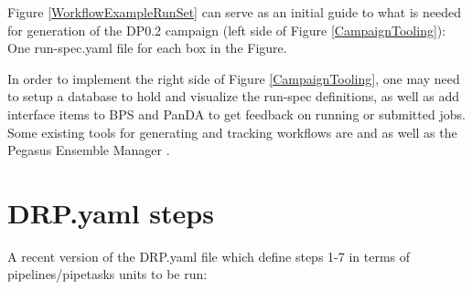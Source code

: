 \documentclass[DM,authoryear,toc]{lsstdoc}
\begin{document}
Figure \ref{WorkflowExampleRunSet} can serve as an initial guide to
what is needed for generation of the DP0.2 campaign (left side of Figure 
\ref{CampaignTooling}): One run-spec.yaml file for each box in the Figure.  

In order to implement the right side of Figure \ref{CampaignTooling}, one may
need to setup a database to hold and visualize the run-spec definitions, 
as well as add interface items to BPS and PanDA to get feedback on running
or submitted jobs.  Some existing tools for generating and tracking 
workflows are \cite{airflow} and \cite{POMS} as well as the Pegasus Ensemble Manager \cite{PEM}.

\section{DRP.yaml steps}
A recent version of the DRP.yaml file which define steps 1-7 in terms of pipelines/pipetasks units
to be run:
\end{document}

